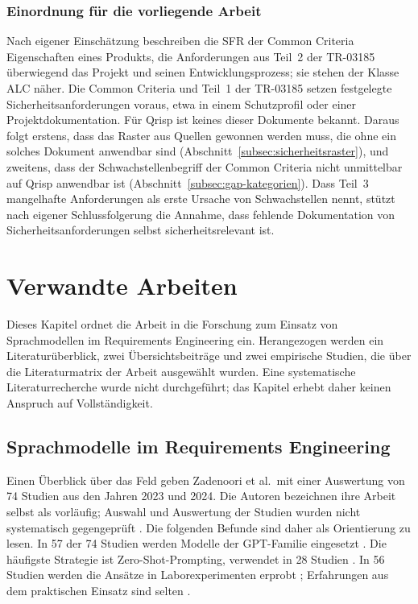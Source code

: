 \documentclass[11pt,a4paper]{report}
\begin{document}
\subsection{Einordnung für die vorliegende Arbeit}
\label{subsec:cc-bsi-einordnung}

Nach eigener Einschätzung beschreiben die SFR der Common Criteria
Eigenschaften eines Produkts, die Anforderungen aus Teil~2 der TR-03185
überwiegend das Projekt und seinen Entwicklungsprozess; sie stehen der
Klasse ALC näher. Die Common
Criteria und Teil~1 der TR-03185 setzen festgelegte
Sicherheitsanforderungen voraus, etwa in einem Schutzprofil oder einer
Projektdokumentation. Für Qrisp ist keines dieser Dokumente bekannt.
Daraus folgt erstens, dass das Raster aus Quellen gewonnen werden muss,
die ohne ein solches Dokument anwendbar sind
(Abschnitt~\ref{subsec:sicherheitsraster}), und zweitens, dass der
Schwachstellenbegriff der Common Criteria nicht unmittelbar auf Qrisp
anwendbar ist (Abschnitt~\ref{subsec:gap-kategorien}). Dass Teil~3
mangelhafte Anforderungen als erste Ursache von Schwachstellen nennt,
stützt nach eigener Schlussfolgerung die Annahme, dass fehlende
Dokumentation von Sicherheitsanforderungen selbst sicherheitsrelevant
ist.


\chapter{Verwandte Arbeiten}
\label{cha:verwandte-arbeiten}

Dieses Kapitel ordnet die Arbeit in die Forschung zum Einsatz von
Sprachmodellen im Requirements Engineering ein. Herangezogen werden ein
Literaturüberblick, zwei Übersichtsbeiträge und zwei empirische
Studien, die über die Literaturmatrix der Arbeit ausgewählt wurden. Eine
systematische Literaturrecherche wurde nicht durchgeführt; das Kapitel
erhebt daher keinen Anspruch auf Vollständigkeit.

\section{Sprachmodelle im Requirements Engineering}
\label{sec:vw-llm-re}

Einen Überblick über das Feld geben Zadenoori et al.\ mit einer
Auswertung von 74 Studien aus den Jahren 2023 und 2024. Die Autoren
bezeichnen ihre Arbeit selbst als vorläufig; Auswahl und Auswertung der
Studien wurden nicht systematisch gegengeprüft
\cite[Abschn.~1]{zadenoori2025slr}. Die folgenden Befunde sind daher als
Orientierung zu lesen. In 57 der 74 Studien werden Modelle der
GPT-Familie eingesetzt \cite[Abschn.~5.4.3]{zadenoori2025slr}. Die
häufigste Strategie ist Zero-Shot-Prompting, verwendet in 28 Studien
\cite[Abschn.~5.3.1]{zadenoori2025slr}. In 56 Studien werden die
Ansätze in Laborexperimenten erprobt
\cite[Abschn.~5.6.2]{zadenoori2025slr}; Erfahrungen aus dem praktischen
Einsatz sind selten \cite[Zusammenfassung]{zadenoori2025slr}.
\end{document}
